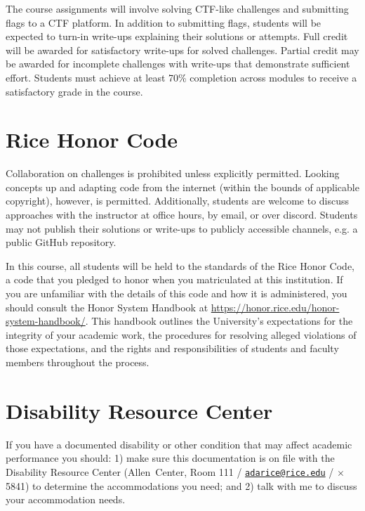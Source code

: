\documentclass[11pt]{article}
\begin{document}
\begin{flushleft}
The course assignments will involve solving CTF-like challenges and submitting flags to a CTF platform. In addition to submitting flags, students will be expected to turn-in write-ups explaining their solutions or attempts. Full credit will be awarded for satisfactory write-ups for solved challenges. Partial credit may be awarded for incomplete challenges with write-ups that demonstrate sufficient effort. Students must achieve at least 70\% completion across modules to receive a satisfactory grade in the course.

\section{Rice Honor Code}\label{rice-honor-code}

Collaboration on challenges is prohibited unless explicitly permitted. Looking concepts up and adapting code from the internet (within the bounds of applicable copyright), however, is permitted. Additionally, students are welcome to discuss approaches with the instructor at office hours, by email, or over discord. Students may not publish their solutions or write-ups to publicly accessible channels, e.g. a public GitHub repository.

In this course, all students will be held to the standards of the Rice
Honor Code, a code that you pledged to honor when you matriculated at
this institution. If you are unfamiliar with the details of this code
and how it is administered, you should consult the Honor System Handbook
at \url{https://honor.rice.edu/honor-system-handbook/}. This handbook
outlines the University's expectations for the integrity of your
academic work, the procedures for resolving alleged violations of those
expectations, and the rights and responsibilities of students and
faculty members throughout the process.

\section{Disability Resource Center}\label{disability-resource-center}

If you have a documented disability or other condition that may affect
academic performance you should: 1) make sure this documentation is on
file with the Disability Resource Center (Allen~Center, Room 111 /
\href{mailto:adarice@rice.edu}{\texttt{adarice@rice.edu}} / $\times$5841) to determine
the accommodations you need; and 2) talk with me to discuss your
accommodation needs.


\end{flushleft}
\end{document}
